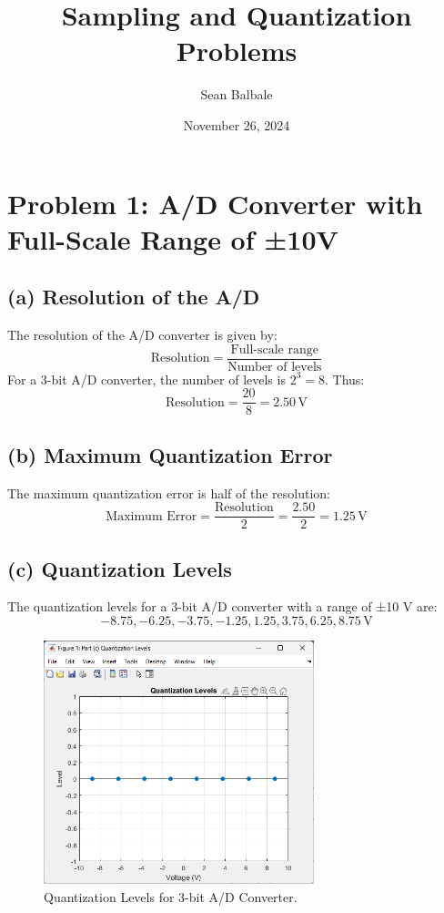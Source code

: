 \documentclass[12pt]{article}
\title{Sampling and Quantization Problems}
\author{Sean Balbale}
\date{November 26, 2024}
\begin{document}
\maketitle
\newpage

\section{Problem 1: A/D Converter with Full-Scale Range of ±10V}
\subsection*{(a) Resolution of the A/D}
The resolution of the A/D converter is given by:
\[
\text{Resolution} = \frac{\text{Full-scale range}}{\text{Number of levels}}
\]
For a 3-bit A/D converter, the number of levels is \(2^3 = 8\). Thus:
\[
\text{Resolution} = \frac{20}{8} = 2.50 \, \text{V}
\]

\subsection*{(b) Maximum Quantization Error}
The maximum quantization error is half of the resolution:
\[
\text{Maximum Error} = \frac{\text{Resolution}}{2} = \frac{2.50}{2} = 1.25 \, \text{V}
\]

\subsection*{(c) Quantization Levels}
The quantization levels for a 3-bit A/D converter with a range of ±10 V are:
\[
-8.75, -6.25, -3.75, -1.25, 1.25, 3.75, 6.25, 8.75 \, \text{V}
\]

\begin{figure}[H]
    \centering
    \includegraphics[width=0.7\textwidth]{C_Sketch.png}
    \caption{Quantization Levels for 3-bit A/D Converter.}
    \label{fig:quantization}
\end{figure}
\end{document}
